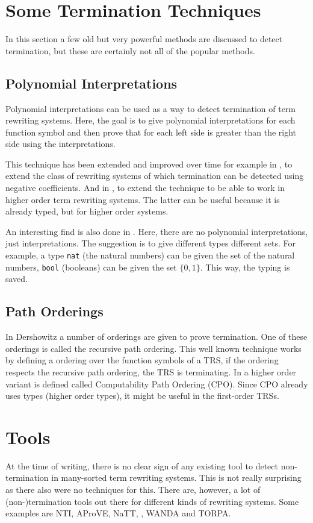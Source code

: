 \section{Some Termination Techniques}
In this section a few old but very powerful methods are discussed to detect termination, but these are certainly not all of the popular methods. 

\subsection{Polynomial Interpretations}
Polynomial interpretations \cite{BENCHERIFA1987137} can be used as a way to detect termination of term rewriting systems. Here, the goal is to give polynomial interpretations for each function symbol and then prove that for each left side is greater than the right side using the interpretations. 

This technique has been extended and improved over time for example in \cite{HIROKAWA:PolyNeg}, to extend the class of rewriting systems of which termination  can be detected using negative coefficients. And in \cite{FUHSKOP:PolyHO}, to extend the technique to be able to work in higher order term rewriting systems. The latter can be useful because it is already typed, but for higher order systems. 

An interesting find is also done in \cite{Pol}. Here, there are no polynomial interpretations, just interpretations. The suggestion is to give different types different sets. For example, a type \texttt{nat} (the natural numbers) can be given the set of the natural numbers, \texttt{bool} (booleans) can be given the set $\{ 0, 1 \}$. This way, the typing is saved.

\subsection{Path Orderings}
In Dershowitz \cite{DERSHOWITZ1982279} a number of orderings are given to prove termination. One of these orderings is called the recursive path ordering. This well known technique works by defining a ordering over the function symbols of a TRS, if the ordering respects the recursive path ordering, the TRS is terminating. In \cite{CPO} a higher order variant is defined called Computability Path Ordering (CPO). Since CPO already uses types (higher order types), it might be useful in the first-order TRSs. 

\section{Tools}
At the time of writing, there is no clear sign of any existing tool to detect non-termination in many-sorted term rewriting systems. This is not really surprising as there also were no techniques for this. There are, however, a lot of (non-)termination tools out there for different kinds of rewriting systems. Some examples are NTI, AProVE, NaTT, \TTTT, WANDA and TORPA.

